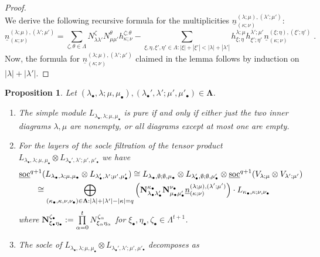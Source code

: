 \documentclass[12pt]{article}
\def\ul  {\underline}
\newtheorem{prop}[theorem]{Proposition}
\begin{document}
\begin{proof}
$$$$
We derive the following recursive formula for the multiplicities $\ul{n}^{(\lambda;\mu),(\lambda';\mu')}_{(\kappa;\nu)}$:
$$
\ul{n}^{(\lambda;\mu),(\lambda';\mu')}_{(\kappa;\nu)}= \sum\limits_{\zeta,\theta\in\Lambda} N^{\zeta}_{\lambda\lambda'} N^{\theta}_{\mu\mu'} h^{\zeta;\theta}_{\kappa;\nu} - \sum\limits_{\xi,\eta,\xi',\eta'\in\Lambda:|\xi|+|\xi'|<|\lambda|+|\lambda'|}  h^{\lambda;\mu}_{\xi;\eta} h^{\lambda';\mu'}_{\xi';\eta'} \ul{n}^{(\xi;\eta),(\xi';\eta')}_{(\kappa;\nu)} \;.
$$
Now, the formula for $\ul{n}^{(\lambda;\mu),(\lambda';\mu')}_{(\kappa;\nu)}$ claimed in the lemma follows by induction on $|\lambda|+|\lambda'|$.
\end{proof}


\begin{prop}\label{Prop TT tensor prod simples}
Let $(\lambda_\bullet,\lambda;\mu,\mu_\bullet),(\lambda_\bullet',\lambda';\mu',\mu'_\bullet)\in\bm\Lambda$.
\begin{enumerate}
\item[{\rm (a)}] The simple module $L_{\lambda_\bullet,\lambda;\mu,\mu_\bullet}$ is pure if and only if either just the two inner diagrams $\lambda,\mu$ are nonempty, or all diagrams except at most one are empty.
\item[{\rm (b)}] For the layers of the socle filtration of the tensor product $L_{\lambda_\bullet,\lambda;\mu,\mu_\bullet}\otimes L_{\lambda_\bullet',\lambda';\mu',\mu'_\bullet}$ we have
\begin{align*}
& \ul{\rm soc}^{q+1}(L_{\lambda_\bullet,\lambda;\mu,\mu_\bullet}\otimes L_{\lambda_\bullet',\lambda';\mu',\mu'_\bullet}) \cong L_{\lambda_\bullet,\emptyset;\emptyset,\mu_\bullet}\otimes L_{\lambda_\bullet',\emptyset;\emptyset,\mu'_\bullet} \otimes \ul{\rm soc}^{q+1}(V_{\lambda;\mu}\otimes V_{\lambda';\mu'}) \\
& \qquad \cong \bigoplus\limits_{(\kappa_\bullet,\kappa,\nu,\nu_\bullet)\in\bm\Lambda:|\lambda|+|\lambda'|-|\kappa|=q} \left({\bf N}^{\kappa_\bullet}_{\lambda_\bullet\lambda'_\bullet} {\bf N}^{\nu_\bullet}_{\mu_\bullet\mu'_\bullet} \ul{n}^{(\lambda;\mu),(\lambda';\mu')}_{(\kappa;\nu)} \right) \cdot L_{\kappa_\bullet,\kappa;\nu,\nu_\bullet}
\end{align*}
where ${\bf N}^{\zeta_\bullet}_{\xi_\bullet\eta_\bullet} := \prod\limits_{\alpha=0}^t N^{\zeta_\alpha}_{\xi_\alpha\eta_\alpha}$ for $\xi_\bullet,\eta_\bullet,\zeta_\bullet\in\Lambda^{t+1}$.
\item[{\rm (c)}] The socle of $L_{\lambda_\bullet,\lambda;\mu,\mu_\bullet}\otimes L_{\lambda_\bullet',\lambda';\mu',\mu'_\bullet}$ decomposes as

\end{enumerate}
\end{prop}
\end{document}
